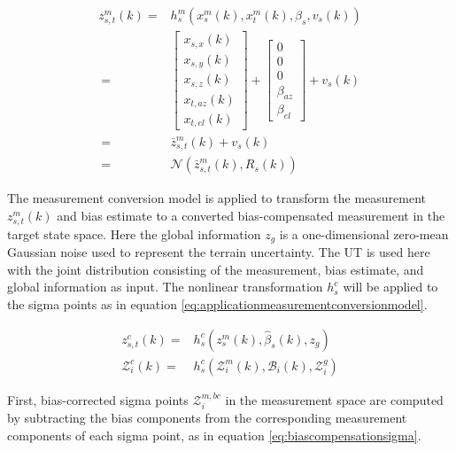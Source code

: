 \documentclass[journal]{IEEEtran}
\begin{document}
\begin{equation}
\begin{aligned}
    z_{s,t}^m(k) ={}& h_s^m(x_s^m(k), x_t^m(k), \beta_s, v_s(k)) \\
    \ ={}& \begin{bmatrix}
            x_{s,x}(k) \\
            x_{s,y}(k) \\
            x_{s,z}(k) \\
            x_{t,az}(k) \\
            x_{t,el}(k)
        \end{bmatrix} + \begin{bmatrix}
            0 \\
            0 \\
            0 \\
            \beta_{az} \\
            \beta_{el}
        \end{bmatrix} + v_s(k) \\
    \ ={}& \bar{z}_{s,t}^{m}(k) + v_s(k) \\
    \ ={}& \mathcal{N}(\bar{z}_{s,t}^{m}(k), R_s(k))
\end{aligned} \label{eq:applicationmeasurementmodel}
\end{equation}

The measurement conversion model is applied to transform the measurement $z_{s,t}^m(k)$ and bias estimate to a converted bias-compensated measurement in the target state space. Here the global information $z_g$ is a one-dimensional zero-mean Gaussian noise used to represent the terrain uncertainty. The UT is used here with the joint distribution consisting of the measurement, bias estimate, and global information as input. The nonlinear transformation $h_s^c$ will be applied to the sigma points as in equation \ref{eq:applicationmeasurementconversionmodel}.

\begin{equation}
\begin{aligned}
    z_{s,t}^c(k) ={}& h_s^c(z_s^m(k), \hat{\beta}_s(k), z_g) \\
    \mathcal{Z}_i^c(k) ={}& h_{s}^{c}( \mathcal{Z}_i^m(k), \mathcal{B}_i(k), \mathcal{Z}_i^g )
\end{aligned} \label{eq:applicationmeasurementconversionmodel}
\end{equation}

First, bias-corrected sigma points $\mathcal{Z}_i^{m,bc}$ in the measurement space are computed by subtracting the bias components from the corresponding measurement components of each sigma point, as in equation \ref{eq:biascompensationsigma}.
\end{document}
